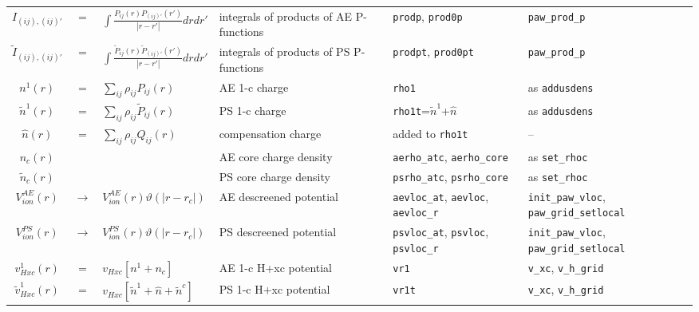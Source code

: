 \documentclass[a4paper,twocolumn,12pt]{article}
\newcommand{\var}[1]{{\tt #1}}
\renewcommand{\theta}{\vartheta}
\begin{document}
\begin{table*}
\begin{small}
\begin{tabular}{|c@{}c@{}l|p{4.5cm}|p{4.5cm}|p{4.0cm}|}
%
%
\hline $I_{(ij),(ij)'}$ &$=$& $\int \frac{P_{ij}(r)P_{(ij)'}(r')}{|r-r'|}dr dr'$ & integrals of products of AE P-functions & \var{prodp}, \var{prod0p} & \var{paw\_prod\_p} \\
$\tilde{I}_{(ij),(ij)'}$ &$=$& $\int \frac{\tilde{P}_{ij}(r)\tilde{P}_{(ij)'}(r')}{|r-r'|} dr dr'$ & integrals of products of PS P-functions & \var{prodpt}, \var{prod0pt} & \var{paw\_prod\_p} \\
%
%
\hline ${n}^1(r)$ &$=$& $\sum_{ij}\rho_{ij}{P}_{ij}(r)$ & AE 1-c charge & \var{rho1} & as \var{addusdens} \\
%
$\tilde{n}^1(r)$ &$=$& $\sum_{ij}\rho_{ij}\tilde{P}_{ij}(r)$ & PS 1-c charge & \var{rho1t}=$\tilde{n}^1$+$\hat{n}$& as \var{addusdens} \\
%
$\hat{n}(r)$ &$=$& $\sum_{ij}\rho_{ij}Q_{ij}(r)$ & compensation charge & added to \var{rho1t}
& -- \\
%
%
\hline $n_c(r)$ && & AE core charge density & \var{aerho\_atc}, \var{aerho\_core} & as \var{set\_rhoc}\\
%
$\tilde{n}_c(r)$ && & PS core charge density & \var{psrho\_atc}, \var{psrho\_core} & as \var{set\_rhoc}\\
%
%
\hline $V^{AE}_{ion}(r)$ 
&$\rightarrow$&$V^{AE}_{ion}(r)\theta(|r-r_c|)$ 
& AE descreened potential &  \var{aevloc\_at}, \var{aevloc}, \var{aevloc\_r}& \var{init\_paw\_vloc}, \var{paw\_grid\_setlocal} \\
%
$V^{PS}_{ion}(r)$  
&$\rightarrow$&$V^{PS}_{ion}(r)\theta(|r-r_c|)$
& PS descreened potential &\var{psvloc\_at}, \var{psvloc}, \var{psvloc\_r}& \var{init\_paw\_vloc}, \var{paw\_grid\_setlocal} \\
%
%
\hline ${v}_{Hxc}^1(r)$ &$=$& $v_{Hxc}[{n}^1+{n}_c]$ & AE 1-c H+xc
potential & \var{vr1} & \var{v\_xc}, \var{v\_h\_grid} \\
%
$\tilde{v}_{Hxc}^1(r)$ &$=$& $v_{Hxc}[\tilde{n}^1+\hat{n}+\tilde{n}^c]$ & PS 1-c H+xc potential & \var{vr1t} & \var{v\_xc}, \var{v\_h\_grid} \\

\end{tabular}
\end{small}
\end{table*}
\end{document}
